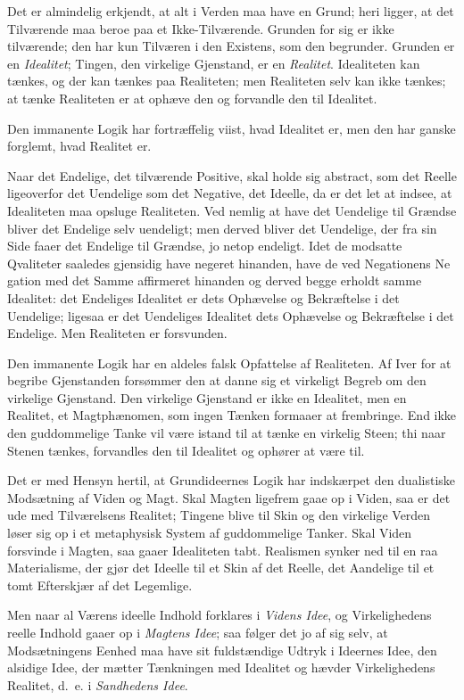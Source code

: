 \documentclass[12pt]{book}
\begin{document}
Det er almindelig erkjendt, at alt i Verden maa have en Grund;
heri ligger, at det Tilværende maa beroe paa et Ikke-Tilværende.
Grunden for sig er ikke tilværende; den har kun Tilværen i den Existens,
som den begrunder. Grunden er en \emph{Idealitet}; Tingen, den
virkelige Gjenstand, er en \emph{Realitet}. Idealiteten kan tænkes, og der
kan tænkes paa Realiteten; men Realiteten selv kan ikke tænkes; at
tænke Realiteten er at ophæve den og forvandle den til Idealitet.

Den immanente Logik har fortræffelig viist, hvad Idealitet er,
men den har ganske forglemt, hvad Realitet er.

Naar det Endelige, det tilværende Positive, skal holde sig abstract,
som det Reelle ligeoverfor det Uendelige som det Negative, det Ideelle,
da er det let at indsee, at Idealiteten maa opsluge Realiteten. Ved
nemlig at have det Uendelige til Grændse bliver det Endelige selv uendeligt;
men derved bliver det Uendelige, der fra sin Side faaer det Endelige
til Grændse, jo netop endeligt. Idet de modsatte Qvaliteter
saaledes gjensidig have negeret hinanden, have de ved Negationens Ne%
gation med det Samme affirmeret hinanden og derved begge erholdt
samme Idealitet: det Endeliges Idealitet er dets Ophævelse og Bekræftelse
i det Uendelige; ligesaa er det Uendeliges Idealitet dets Ophævelse
og Bekræftelse i det Endelige. Men Realiteten er forsvunden.

Den immanente Logik har en aldeles falsk Opfattelse af Realiteten.
Af Iver for at begribe Gjenstanden forsømmer den at danne sig et
virkeligt Begreb om den virkelige Gjenstand. Den virkelige Gjenstand
er ikke en Idealitet, men en Realitet, et Magtphænomen, som ingen
Tænken formaaer at frembringe. End ikke den guddommelige Tanke
vil være istand til at tænke en virkelig Steen; thi naar Stenen tænkes,
forvandles den til Idealitet og ophører at være til.

Det er med Hensyn hertil, at Grundideernes Logik har indskærpet
den dualistiske Modsætning af Viden og Magt. Skal Magten ligefrem
gaae op i Viden, saa er det ude med Tilværelsens Realitet; Tingene
blive til Skin og den virkelige Verden løser sig op i et metaphysisk
System af guddommelige Tanker. Skal Viden forsvinde i Magten,
saa gaaer Idealiteten tabt. Realismen synker ned til en raa Materialisme,
der gjør det Ideelle til et Skin af det Reelle, det Aandelige
til et tomt Efterskjær af det Legemlige.

Men naar al Værens ideelle Indhold forklares i \emph{Videns Idee},
og Virkelighedens reelle Indhold gaaer op i \emph{Magtens Idee}; saa
følger det jo af sig selv, at Modsætningens Eenhed maa have sit fuldstændige
Udtryk i Ideernes Idee, den alsidige Idee, der mætter Tænkningen
med Idealitet og hævder Virkelighedens Realitet, d.~e. i \emph{Sandhedens
Idee}.
\end{document}
